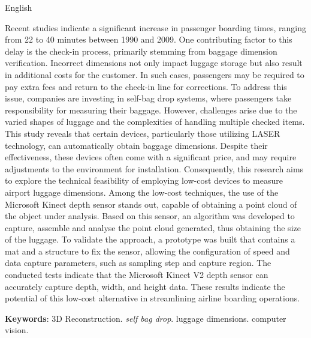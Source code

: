 \begin{resumo}
    \begin{otherlanguage*}{English}
        
        Recent studies indicate a significant increase in passenger boarding times, ranging from 22 to 40 minutes between 1990 and 2009. One contributing factor to this delay is the check-in process, primarily stemming from baggage dimension verification. Incorrect dimensions not only impact luggage storage but also result in additional costs for the customer. In such cases, passengers may be required to pay extra fees and return to the check-in line for corrections.
        To address this issue, companies are investing in self-bag drop systems, where passengers take responsibility for measuring their baggage. However, challenges arise due to the varied shapes of luggage and the complexities of handling multiple checked items. This study reveals that certain devices, particularly those utilizing LASER technology, can automatically obtain baggage dimensions. Despite their effectiveness, these devices often come with a significant price, and may require adjustments to the environment for installation. Consequently, this research aims to explore the technical feasibility of employing low-cost devices to measure airport luggage dimensions.
        Among the low-cost techniques, the use of the Microsoft Kinect depth sensor stands out, capable of obtaining a point cloud of the object under analysis. Based on this sensor, an algorithm was developed to capture, assemble and analyse the point cloud generated, thus obtaining the size of the luggage.
        To validate the approach, a prototype was built that contains a mat and a structure to fix the sensor, allowing the configuration of speed and data capture parameters, such as sampling step and capture region.
        The conducted tests indicate that the Microsoft Kinect V2 depth sensor can accurately capture depth, width, and height data. These results indicate the potential of this low-cost alternative in streamlining airline boarding operations.
            
       \vspace{\onelineskip}
       \noindent
       \textbf{Keywords}: 3D Reconstruction. \textit{self bag drop}. luggage dimensions. computer vision.
    \end{otherlanguage*}
\end{resumo}


\listoffigures*
\cleardoublepage

